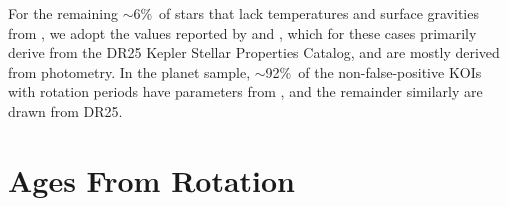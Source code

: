 \documentclass[11pt,twocolumn,tighten]{aastex63}
\newcommand{\fracstarswithprotwithoutbtwenty}{{$\sim$6\%}}
\newcommand{\frackoisnofpwithprotwithbtwenty}{{$\sim$92\%}}
\begin{document}

For the remaining \fracstarswithprotwithoutbtwenty\ of stars that lack
temperatures and surface gravities from
, we adopt the values reported by
\citet{Santos_2019} and \citet{Santos_2021}, which for these cases
primarily derive from the \citet{Mathur_2017} DR25 Kepler Stellar
Properties Catalog, and are mostly derived from photometry.  In the
planet sample, \frackoisnofpwithprotwithbtwenty\ of the
non-false-positive KOIs with rotation periods have parameters from
\citet{Berger_2020a_catalog}, and the remainder similarly are drawn
from DR25. 





\section{Ages From Rotation}
\label{sec:rotage}
\end{document}
